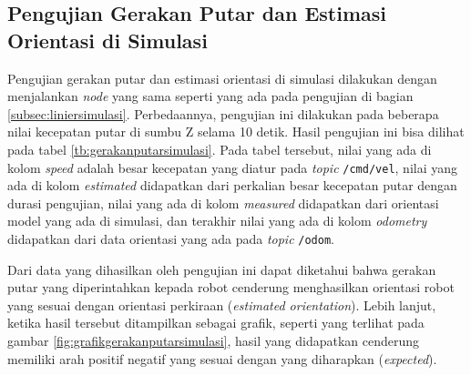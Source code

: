 \subsection{Pengujian Gerakan Putar dan Estimasi Orientasi di Simulasi}
\label{subsec:putarsimulasi}

Pengujian gerakan putar dan estimasi orientasi di simulasi dilakukan dengan menjalankan \emph{node} yang sama seperti yang ada pada pengujian di bagian \ref{subsec:liniersimulasi}.
Perbedaannya, pengujian ini dilakukan pada beberapa nilai kecepatan putar di sumbu Z selama 10 detik.
Hasil pengujian ini bisa dilihat pada tabel \ref{tb:gerakanputarsimulasi}.
Pada tabel tersebut, nilai yang ada di kolom \emph{speed} adalah besar kecepatan yang diatur pada \emph{topic} \lstinline{/cmd/vel},
  nilai yang ada di kolom \emph{estimated} didapatkan dari perkalian besar kecepatan putar dengan durasi pengujian,
  nilai yang ada di kolom \emph{measured} didapatkan dari orientasi model yang ada di simulasi,
  dan terakhir nilai yang ada di kolom \emph{odometry} didapatkan dari data orientasi yang ada pada \emph{topic} \lstinline{/odom}.



Dari data yang dihasilkan oleh pengujian ini dapat diketahui bahwa gerakan putar yang diperintahkan kepada robot cenderung menghasilkan orientasi robot yang sesuai dengan orientasi perkiraan (\emph{estimated orientation}).
Lebih lanjut, ketika hasil tersebut ditampilkan sebagai grafik,
  seperti yang terlihat pada gambar \ref{fig:grafikgerakanputarsimulasi},
  hasil yang didapatkan cenderung memiliki arah positif negatif yang sesuai dengan yang diharapkan (\emph{expected}).


